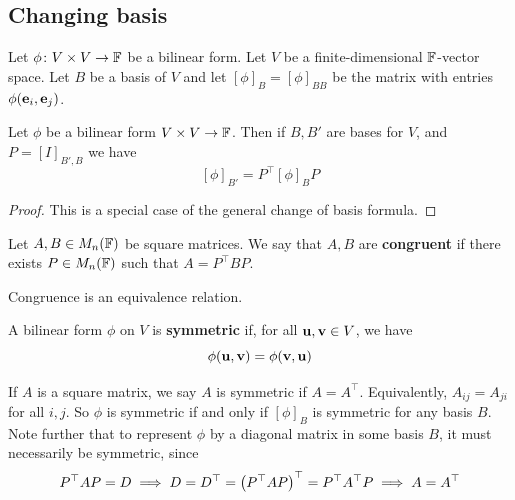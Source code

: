 \documentclass[a4paper]{article}
\begin{document}
\subsection{Changing basis}
Let \( \phi \colon V \times V \to \mathbb {{\mathbb{F}}} \) be a bilinear form.
Let \( V \) be a finite-dimensional \( {\mathbb{F}} \)-vector space.
Let \( B \) be a basis of \( V \) and let \( [\phi]_B = [\phi]_{BB} \) be the matrix with entries \( \phi({\bf e}_i, {\bf e}_j) \).
\begin{lemma}
	Let \( \phi \) be a bilinear form \( V \times V \to {\mathbb{F}} \).
	Then if \( B, B' \) are bases for \( V \), and \( P = [I]_{B', B} \) we have
	\[
		[\phi]_{B'} = P^\top [\phi]_B P
	\]
\end{lemma}
\begin{proof}
	This is a special case of the general change of basis formula.
\end{proof}
\begin{definition}
	Let \( A, B \in M_n({\mathbb{F}}) \) be square matrices.
	We say that \( A, B \) are \textbf{congruent} if there exists \( P \in M_n({\mathbb{F}}) \) such that \( A = P^\top B P \).
\end{definition}
\begin{remark}
	Congruence is an equivalence relation.
\end{remark}
\begin{definition}
	A bilinear form \( \phi \) on \( V \) is \textbf{symmetric} if, for all \( {\bf u}, {\bf v} \in V \), we have
	\[
		\phi({\bf u},{\bf v}) = \phi({\bf v},{\bf u})
	\]
\end{definition}
\begin{remark}
	If \( A \) is a square matrix, we say \( A \) is symmetric if \( A = A^\top \).
	Equivalently, \( A_{ij} = A_{ji} \) for all \( i, j \).
	So \( \phi \) is symmetric if and only if \( [\phi]_B \) is symmetric for any basis \( B \).
	Note further that to represent \( \phi \) by a diagonal matrix in some basis \( B \), it must necessarily be symmetric, since
	\[
		P^\top A P = D \implies D = D^\top = \qty(P^\top A P)^\top = P^\top A^\top P \implies A = A^\top
	\]
\end{remark}
\end{document}

